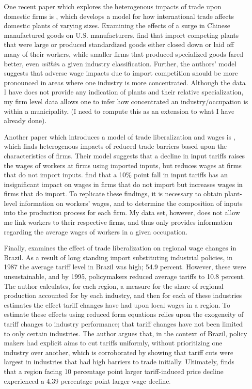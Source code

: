 \documentclass[12pt]{article}
\begin{document}
One recent paper which explores the heterogenous impacts of trade upon domestic firms is \citet{holmes1},
which develops a model for how international trade affects domestic plants of varying sizes. 
Examining the effects of a surge in Chinese manufactured goods on U.S. manufacturers,
\citeauthor{holmes1} find that import competing plants that were large or produced standardized goods 
either closed down or laid off many of their workers, while smaller firms that produced specialized 
goods fared better, even \textit{within} a given industry classification. Further, the authors' 
model suggests that adverse wage impacts due to import competition should be more pronounced in 
areas where one industry is more concentrated. Although the data I have does not provide any 
indication of plants and their relative specialization, my firm level data allows one to infer 
how concentrated an industry/occupation is within a municipality. (I need to compute this as
an extension to what I have already done).

Another paper which introduces a model of trade liberalization and wages is \citet{amiti},
which finds heterogenous impacts of reduced trade barriers based upon the characteristics of
firms. Their model suggests that a decline in input tariffs raises the wages of workers at firms
using imported inputs, but reduces wages at firms that do not import inputs. 
\citeauthor{amiti} find that a 10\% point fall in input tariffs has an insignificant impact
on wages in firms that do not import but increases wages in firms that do import. 
To replicate these findings, it is necessary to obtain plant-level information on workers'
wages, and to determine the composition of inputs into the production process for each firm.
My data set, however, does not allow me link workers to their respective firms, and thus only
provides information regarding the average wages of workers in a given occupation. 

Finally, \citet{kovak}  examines 
the effect of trade liberalization on regional wage changes in Brazil. As a result of long standing
import substituting industrial policies, in 1987 the average tariff level in Brazil was high; 
54.9 percent. However, these were unsustainable, and by 1995, policymakers reduced average tariffs 
to 10.8 percent.
The author calculates, for each region, a measure for the share of regional production 
accounted for by each industry, and then for each of these industries estimates the effect tariff 
changes have had upon local wages in a region. 
To estimate these effects using reduced form equations relies upon the exogeneity of tariff changes to 
industry performance; that tariff changes have not been limited to only certain industries. 
The author argues that, in the context of Brazil, policy makers had explicit aims to cut tariffs 
uniformly, without prioritizing one industry over another, which is corroborated by showing that 
tariff cuts were largest in industries that had high barriers to trade initially.
Ultimately, \citeauthor{kovak} finds that a region facing 10 percentage point larger tariff-induced price 
decline experienced a 4.39 percentage point larger wage decline.
\end{document}
